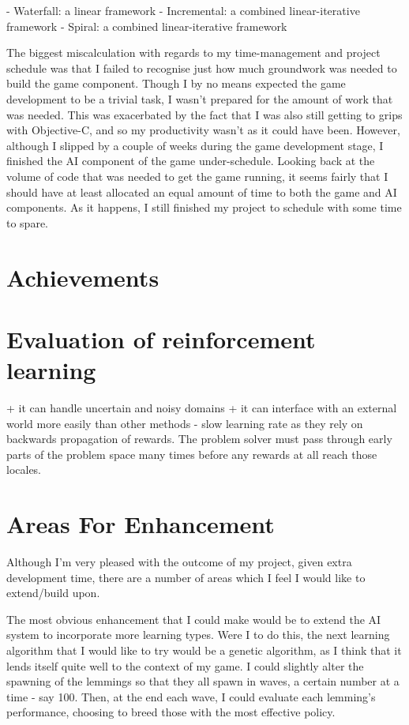 \documentclass[a4paper,oneside]{report}
\begin{document}
- Waterfall: a linear framework
- Incremental: a combined linear-iterative framework
- Spiral: a combined linear-iterative framework
		
The biggest miscalculation with regards to my time-management and project schedule was that I failed to recognise just how much groundwork was needed to build the game component. Though I by no means expected the game development to be a trivial task, I wasn't prepared for the amount of work that was needed. This was exacerbated by the fact that I was also still getting to grips with Objective-C, and so my productivity wasn't as it could have been. However, although I slipped by a couple of weeks during the game development stage, I finished the AI component of the game under-schedule. Looking back at the volume of code that was needed to get the game running, it seems fairly that I should have at least allocated an equal amount of time to both the game and AI components. As it happens, I still finished my project to schedule with some time to spare.

\section{Achievements}

\section{Evaluation of reinforcement learning}

+ it can handle uncertain and noisy domains
+ it can interface with an external world more easily than other methods
- slow learning rate as they rely on backwards propagation of rewards. The problem solver must pass through early parts of the problem space many times before any rewards at all reach those locales.


\section{Areas For Enhancement}

Although I'm very pleased with the outcome of my project, given extra development time, there are a number of areas which I feel I would like to extend/build upon.

The most obvious enhancement that I could make would be to extend the AI system to incorporate more learning types. Were I to do this, the next learning algorithm that I would like to try would be a genetic algorithm, as I think that it lends itself quite well to the context of my game. I could slightly alter the spawning of the lemmings so that they all spawn in waves, a certain number at a time - say 100. Then, at the end each wave, I could evaluate each lemming's performance, choosing to breed those with the most effective policy.
\end{document}
